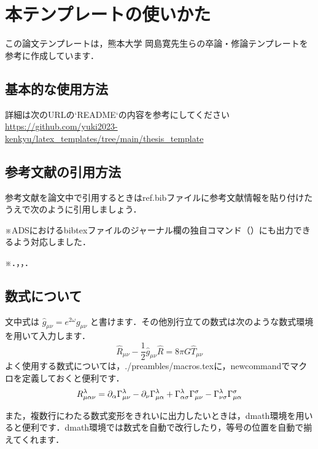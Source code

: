 \chapter{本テンプレートの使いかた}
この論文テンプレートは，熊本大学 岡島寛先生らの卒論・修論テンプレートを参考に作成しています\cite{卒論修論テンプレート}．
    \section{基本的な使用方法}
    詳細は次のURLの`README`の内容を参考にしてください\url{https://github.com/yuki2023-kenkyu/latex_templates/tree/main/thesis_template}
	\section{参考文献の引用方法}
	参考文献を論文中で引用するときはref.bibファイルに参考文献情報を貼り付けたうえで次のように引用しましょう\cite{G_ng_r_2021}．

    ※ADSにおけるbibtexファイルのジャーナル欄の独自コマンド（\apj）にも出力できるよう対応しました\cite{2023ApJ...944..124T}．

    ※\cite{小形正男2024-09-21}．\cite{梶野洸2024-01-19}，\cite{前田恵一2024-10-23}，\cite{Planck:2018vyg}．
	\section{数式について}
	文中式は $\hat{g}_{\mu\nu}=e^{2\omega}g_{\mu\nu}$ と書けます．その他別行立ての数式は次のような数式環境を用いて入力します．
        \begin{equation}
            \hat{R}_{\mu\nu} - \frac{1}{2}\hat{g}_{\mu\nu}\hat{R} = 8\pi G\hat{T}_{\mu\nu}\label{eq:Einstein_eq}
        \end{equation}
	よく使用する数式については，./preambles/macros.texに，newcommandでマクロを定義しておくと便利です．
		\begin{equation}
			R_{\mu\alpha\nu}^{\lambda}=\partial_{\alpha}\Gamma^{\lambda}_{\mu \nu} - \partial_{\nu}\Gamma^{\lambda}_{\mu \alpha} + \Gamma^{\lambda}_{\alpha \sigma}\Gamma^{\sigma}_{\mu \nu} - \Gamma^{\lambda}_{\nu \sigma}\Gamma^{\sigma}_{\mu \alpha}\label{eq:Riemann_tensor}
		\end{equation}

	また，複数行にわたる数式変形をきれいに出力したいときは，dmath環境を用いると便利です．dmath環境では数式を自動で改行したり，等号の位置を自動で揃えてくれます．

